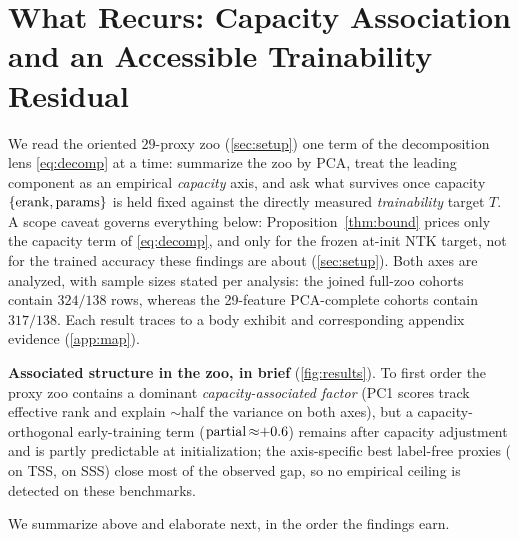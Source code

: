 \section{What Recurs: Capacity Association and an Accessible Trainability Residual}
\label{sec:cap-train}
\enlargethispage{-\baselineskip}

\noindent
We read the oriented $29$-proxy zoo (\cref{sec:setup}) one term of the
decomposition lens \cref{eq:decomp} at a time: summarize the zoo by PCA, treat the
leading component as an empirical \emph{capacity} axis, and ask what survives once
capacity $\{\operatorname{erank},\mathrm{params}\}$ is held fixed against the directly measured
\emph{trainability} target $T$. A scope caveat governs everything below:
Proposition~\ref{thm:bound} prices only the capacity term of \cref{eq:decomp}, and
only for the frozen at-init NTK target, not for the trained accuracy these findings
are about (\cref{sec:setup}). Both axes are analyzed, with sample sizes stated
per analysis: the joined full-zoo cohorts contain $324/138$ rows, whereas the
29-feature PCA-complete cohorts contain $317/138$. Each result traces to a body
exhibit and corresponding appendix evidence (\cref{app:map}).

\begin{findingframe}
\textbf{Associated structure in the zoo, in brief} (\cref{fig:results}). To first order the
proxy zoo contains a dominant \emph{capacity-associated factor} (PC1 scores track
effective rank and explain ${\sim}$half the variance on both axes), but a
capacity-orthogonal
early-training term ($\operatorname{partial}{\approx}{+}0.6$) remains after capacity
adjustment and is partly predictable at initialization; the axis-specific best
label-free proxies ( on TSS,  on SSS) close most of the
observed gap, so no empirical ceiling is detected on these
benchmarks.
\end{findingframe}

\noindent
We summarize above and elaborate next, in the order the findings earn.

